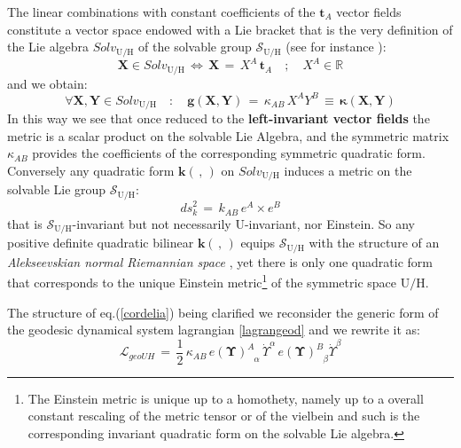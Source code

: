 \documentclass[10pt,a4paper]{article}
\newcommand{\ft}[2]{{\textstyle\frac{#1}{#2}}}
\begin{document}
The linear combinations with constant coefficients of the $\mathbf{t}_A$ vector fields constitute a vector space endowed with a Lie bracket that is the very definition of the Lie algebra $Solv_{\mathrm{U/H}}$ of the solvable group $\mathcal{S}_{\mathrm{U/H}}$ (see for instance \cite{fre2023book}):
\begin{equation}\label{algsolvay}
  \mathbf{X} \in Solv_{\mathrm{U/H}} \, \Leftrightarrow \,
  \mathbf{X}\, = \,X^A \, \mathbf{t}_A \quad ; \quad X^A \in \mathbb{R}
\end{equation}
and we obtain:
\begin{equation}\label{solvanorma}
  \forall \mathbf{X},\mathbf{Y} \in Solv_{\mathrm{U/H}} \quad : \quad \mathbf{g}(\mathbf{X},\mathbf{Y}) \, = \, \kappa_{AB}\, X^A Y^B \, \equiv \, \boldsymbol{\kappa}(\mathbf{X},\mathbf{Y})
\end{equation}
In this way we see that once reduced to the \textbf{left-invariant vector fields} the metric is a scalar product on the solvable Lie Algebra, and the symmetric matrix $\kappa_{AB}$ provides the coefficients of the corresponding symmetric quadratic form. 
Conversely any quadratic form $\boldsymbol{k}(\,, \,)$ on $Solv_{\mathrm{U/H}}$  induces a metric on the solvable Lie group $\mathcal{S}_{\mathrm{U/H}}$:
\begin{equation}\label{altrametra}
  {ds}_k^2 \, = \, k_{AB} \, e^A \times e^B
\end{equation}
that is $\mathcal{S}_{\mathrm{U/H}}$-invariant but not necessarily $\mathrm{U}$-invariant, nor Einstein. So any { positive definite quadratic bilinear} $\boldsymbol{k}(\,, \,)$ equips $\mathcal{S}_{\mathrm{U/H}}$ with the structure of an \textit{Alekseevskian normal Riemannian space} \cite{Alekseevsky1975,Alekseevsky:2003vw,Cortes,TSnaviga}, yet there is only one quadratic form that corresponds to the unique Einstein metric\footnote{The Einstein metric is unique up to a homothety, namely up to a overall constant rescaling of the metric tensor or of the vielbein and such is the corresponding invariant quadratic form on the solvable Lie algebra.} of the symmetric space $\mathrm{U/H}$.
\par
The structure of eq.(\ref{cordelia}) being clarified we reconsider the generic form of the geodesic dynamical system lagrangian \ref{lagrangeod} and we rewrite it as:
\begin{equation}\label{uhlagrageo}
  \mathcal{L}_{geoUH} \, = \, \ft 12 \,\kappa_{AB} \,
  e(\boldsymbol{\Upsilon})^{A}_{\phantom{A}\alpha} \,\dot{\Upsilon}^\alpha \,e(\boldsymbol{\Upsilon})^{B}_{\phantom{B}\beta} \dot{\Upsilon}^\beta
\end{equation}
\end{document}
